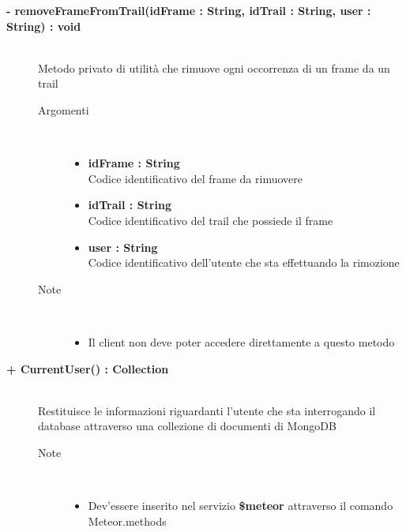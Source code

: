 \begin{description}
	\begin{description}
		\item[\textbf{\color{blue}- removeFrameFromTrail(idFrame : String, idTrail : String, user :  String)	: void		}] \hfill \\
			Metodo privato di utilità che rimuove ogni occorrenza di un frame da un trail
			
		\begin{description}
			\item[Argomenti] \hfill \\
				\begin{itemize}
				
					\item \textbf{idFrame : String			} \hfill \\
					Codice identificativo del frame da rimuovere
					\item \textbf{idTrail : String			} \hfill \\
					Codice identificativo del trail che possiede il frame
					\item \textbf{user : String			} \hfill \\
					Codice identificativo dell'utente che sta effettuando la rimozione
					
				\end{itemize}
			\item[Note] \hfill \\
			\begin{itemize}
					\item Il client non deve poter accedere direttamente a questo metodo
				\end{itemize}
		\end{description}
	\end{description}

	\begin{description}
		\item[\textbf{\color{blue}+ CurrentUser() : Collection			}] \hfill \\
			Restituisce le informazioni riguardanti l'utente che sta interrogando il database attraverso una collezione di documenti di MongoDB
			
		\begin{description}
			
			\item[Note] \hfill \\
			\begin{itemize}
					\item Dev'essere inserito nel servizio \textbf{\$meteor} attraverso il comando Meteor.methods
				\end{itemize}
		\end{description}
	\end{description}


\end{description}
